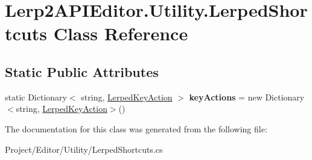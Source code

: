 \hypertarget{class_lerp2_a_p_i_editor_1_1_utility_1_1_lerped_shortcuts}{}\section{Lerp2\+A\+P\+I\+Editor.\+Utility.\+Lerped\+Shortcuts Class Reference}
\label{class_lerp2_a_p_i_editor_1_1_utility_1_1_lerped_shortcuts}
\subsection*{Static Public Attributes}
\begin{DoxyCompactItemize}
\item 
\mbox{\label{class_lerp2_a_p_i_editor_1_1_utility_1_1_lerped_shortcuts_a08fef52d30c4f608218f1b472f66ae26}} 
static Dictionary$<$ string, \hyperlink{class_lerp2_a_p_i_editor_1_1_utility_1_1_lerped_key_action}{Lerped\+Key\+Action} $>$ {\bfseries key\+Actions} = new Dictionary$<$string, \hyperlink{class_lerp2_a_p_i_editor_1_1_utility_1_1_lerped_key_action}{Lerped\+Key\+Action}$>$()
\end{DoxyCompactItemize}


The documentation for this class was generated from the following file\+:\begin{DoxyCompactItemize}
\item 
Project/\+Editor/\+Utility/Lerped\+Shortcuts.\+cs\end{DoxyCompactItemize}
